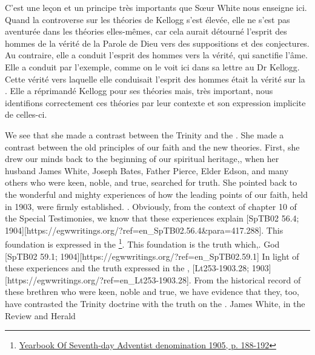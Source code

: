 C'est une leçon et un principe très importants que Sœur White nous enseigne ici. Quand la controverse sur les théories de Kellogg s'est élevée, elle ne s'est pas aventurée dans les théories elles-mêmes, car cela aurait détourné l'esprit des hommes de la vérité de la Parole de Dieu vers des suppositions et des conjectures. Au contraire, elle a conduit l'esprit des hommes vers la vérité, qui sanctifie l'âme. Elle a conduit par l'exemple, comme on le voit ici dans sa lettre au Dr Kellogg. Cette vérité vers laquelle elle conduisait l'esprit des hommes était la vérité sur la . Elle a réprimandé Kellogg pour ses théories mais, très important, nous identifions correctement ces théories par leur contexte et son expression implicite de celles-ci.


We see that she made a contrast between the Trinity and the . She made a contrast between the old principles of our faith and the new theories. First, she drew our minds back to the beginning of our spiritual heritage,, when her husband James White, Joseph Bates, Father Pierce, Elder Edson, and many others who were keen, noble, and true, searched for truth. She pointed back to the wonderful and mighty experiences of how the leading points of our faith, held in 1903, were firmly established.   . Obviously, from the context of chapter 10 of the Special Testimonies, we know that these experiences explain [SpTB02 56.4; 1904][https://egwwritings.org/?ref=en\_SpTB02.56.4\&para=417.288]. This foundation is expressed in the \footnote{\href{https://static1.squarespace.com/static/554c4998e4b04e89ea0c4073/t/59d17e24c027d84167e17617/1506901547915/SDA-YB1905+\%28P.+188-192\%29.pdf}{Yearbook Of Seventh-day Adventist denomination 1905, p. 188-192}}. This foundation is the truth which,. God [SpTB02 59.1; 1904][https://egwwritings.org/?ref=en\_SpTB02.59.1] In light of these experiences and the truth expressed in the , [Lt253-1903.28; 1903][https://egwwritings.org/?ref=en\_Lt253-1903.28]. From the historical record of these brethren who were keen, noble and true, we have evidence that they, too, have contrasted the Trinity doctrine with the truth on the . James White, in the Review and Herald 